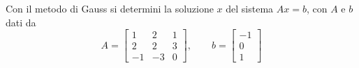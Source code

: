 Con il metodo di Gauss si determini la soluzione $x$ del sistema $Ax=b$, con $A$ e $b$ dati
da
\bigskip
\[
A=\left[
\begin{array}{ccc}
1 & 2 & 1 \\
2 & 2 & 3\\
-1 & -3 & 0
\end{array}\right],\quad \quad
b=\left[
\begin{array}{c}
  -1\\
   0 \\
   1
\end{array}\right]
\]

